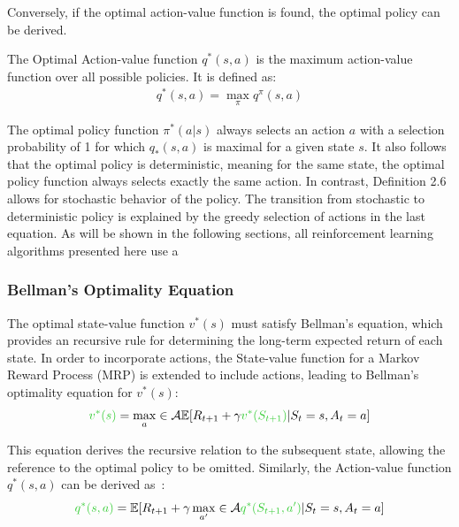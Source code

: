 \documentclass[../xlapes02]{subfiles}
\begin{document}
    Conversely, if the optimal action-value function is found, the optimal policy can be derived.
    \begin{definition}
        The Optimal Action-value function $q^*(s, a)$ is the maximum action-value function over all possible policies. It is defined as:
        \begin{equation}
            \begin{split}
                q^*(s, a) = \max_{\pi} q^{\pi}(s, a)
            \end{split}
        \end{equation}
    \end{definition}

    The optimal policy function $\pi^*(a | s)$ always selects an action $a$ with a selection probability of 1 for which $q_*(s, a)$ is maximal for a given state $s$. It also follows that the optimal policy is deterministic, meaning for the same state, the optimal policy function always selects exactly the same action. In contrast, Definition 2.6 allows for stochastic behavior of the policy. The transition from stochastic to deterministic policy is explained by the greedy selection of actions in the last equation. As will be shown in the following sections, all reinforcement learning algorithms presented here use a

    \subsubsection{Bellman's Optimality Equation}\label{subsubsec:bellman-optimality-equation}
    The optimal state-value function $v^*(s)$ must satisfy Bellman's equation, which provides an recursive rule for determining the long-term expected return of each state. In order to incorporate actions, the State-value function for a Markov Reward Process (MRP) is extended to include actions, leading to Bellman's optimality equation for $v^*(s)$:
    \[
        \textcolor[RGB]{51,204,51}{v^*(s)} = \max_{a} \in \mathcal{A} \mathbb{E}[R_{t+1} + \gamma \textcolor[RGB]{51,204,51}{v^*(S_{t+1})} | S_t = s, A_t = a]
    \]

    This equation derives the recursive relation to the subsequent state, allowing the reference to the optimal policy to be omitted. Similarly, the Action-value function $q^*(s, a)$ can be derived as~\cite{rao2022foundations}:
    \[
        \textcolor[RGB]{51,204,51}{q^*(s, a)} = \mathbb{E}[R_{t+1} + \gamma \max_{a'} \in \mathcal{A} \textcolor[RGB]{51,204,51}{q^*(S_{t+1}, a')} | S_t = s, A_t = a]
    \]
\end{document}
